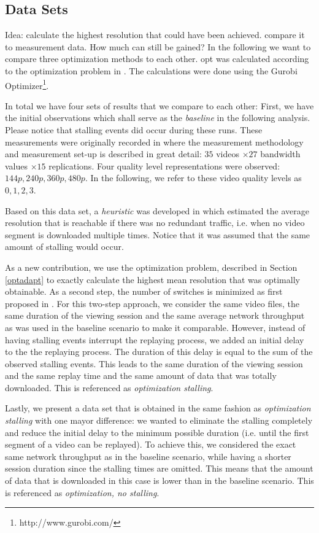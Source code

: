 
\subsection{Data Sets}

Idea: calculate the highest resolution that could have been achieved. compare it to measurement data. How much can still be gained?
In the following we want to compare three optimization methods to each other.
opt was calculated according to the optimization problem in \cite{hossfeld2015identifying}. The calculations were done using the Gurobi Optimizer\footnote{http://www.gurobi.com/}.

In total we have four sets of results that we compare to each other:
First, we have the initial observations which shall serve as the \textit{baseline} in the following analysis. Please notice that stalling events did occur during these runs. These measurements were originally recorded in \cite{sieber16sacrificing} where the measurement methodology and measurement set-up is described in great detail: $35$ videos $\times 27$ bandwidth values $\times 15$ replications. Four quality level representations were observed: $144p, 240p, 360p, 480p$. In the following, we refer to these video quality levels as $0,1,2,3$.

Based on this data set, a \textit{heuristic} was developed in \cite{sieber16sacrificing} which estimated the average resolution that is reachable if there was no redundant traffic, i.e. when no video segment is downloaded multiple times. Notice that it was assumed that the same amount of stalling would occur.

As a new contribution, we use the optimization problem, described in Section \ref{optadapt} to exactly calculate the highest mean resolution that was optimally obtainable. As a second step, the number of switches is minimized as first proposed in \cite{miller2013optimal}. For this two-step approach, we consider the same video files, the same duration of the viewing session and the same average network throughput as was used in the baseline scenario to make it comparable. However, instead of having stalling events interrupt the replaying process, we added an initial delay to the the replaying process. The duration of this delay is equal to the sum of the observed stalling events. This leads to the same duration of the viewing session and the same replay time and the same amount of data that was totally downloaded. This is referenced as \textit{optimization stalling}.

Lastly, we present a data set that is obtained in the same fashion as \textit{optimization stalling} with one mayor difference: we wanted to eliminate the stalling completely and reduce the initial delay to the minimum possible duration (i.e. until the first segment of a video can be replayed). To achieve this, we considered the exact same network throughput as in the baseline scenario, while having a shorter session duration since the stalling times are omitted. This means that the amount of data that is downloaded in this case is lower than in the baseline scenario. This is referenced as \textit{optimization, no stalling}.
